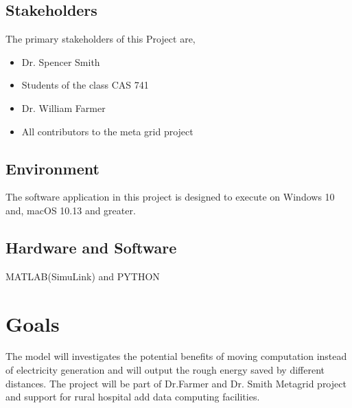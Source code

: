 \documentclass{article}
\begin{document}
\subsection{Stakeholders}
The primary stakeholders of this Project are,
\begin{itemize}

\item Dr. Spencer Smith
\item Students of the class CAS 741
\item Dr. William Farmer
\item All contributors to the meta grid project
\end{itemize}
\subsection{Environment}
The software application in this project is designed to execute on  Windows 10 and, macOS 10.13 and greater.
\subsection{Hardware and Software}
MATLAB(SimuLink) and PYTHON

\section{Goals}

The model will investigates the potential benefits of moving computation instead of electricity generation and will output the rough energy saved by different distances. The project will be part of Dr.Farmer and Dr. Smith  Metagrid project and support for rural hospital add data computing facilities.
\end{document}
